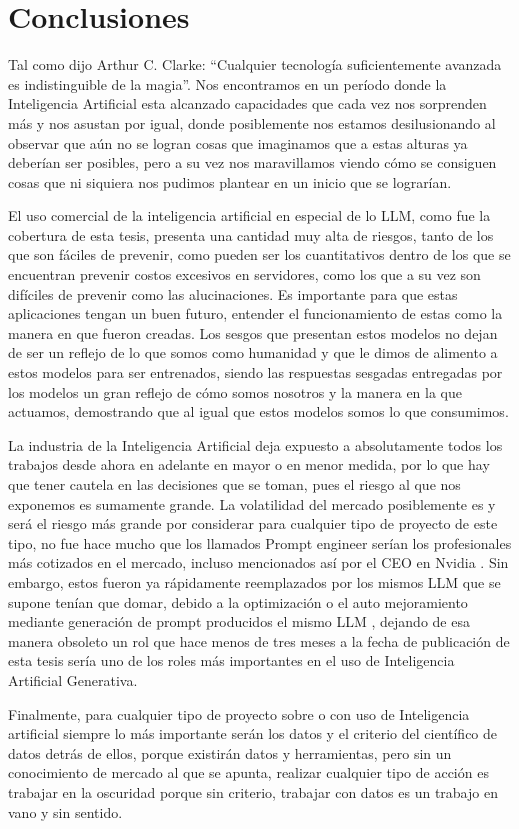 
\chapter{Conclusiones}

\par Tal como dijo Arthur C. Clarke: ``Cualquier tecnología suficientemente avanzada es indistinguible de la magia''. Nos encontramos 
en un período donde la Inteligencia Artificial esta alcanzado capacidades que cada vez nos sorprenden más y nos asustan por igual, donde 
posiblemente nos estamos desilusionando al observar que aún no se logran cosas que imaginamos que a estas alturas ya deberían ser posibles, pero a su vez nos maravillamos viendo cómo se consiguen 
cosas que ni siquiera nos pudimos plantear en un inicio que se lograrían.  

\par El uso comercial de la inteligencia artificial en especial de lo LLM, como fue la cobertura de esta tesis, presenta una cantidad 
muy alta de riesgos, tanto de los que son fáciles de prevenir, como pueden ser los cuantitativos dentro de los que se encuentran prevenir costos excesivos en 
servidores, como los que a su vez son difíciles de prevenir como las alucinaciones.  Es importante para que estas aplicaciones tengan un buen futuro, 
entender el funcionamiento de estas como la manera en que fueron creadas. Los sesgos que presentan estos modelos no dejan de ser un reflejo
de lo que somos como humanidad y que le dimos de alimento a estos modelos para ser entrenados, siendo las respuestas sesgadas entregadas por los modelos un gran reflejo de cómo somos nosotros 
y la manera en la que actuamos, demostrando que al igual que estos modelos somos lo que consumimos.  

\par La industria de la Inteligencia Artificial deja expuesto a absolutamente todos los trabajos desde ahora en adelante en mayor 
o en menor medida, por lo que hay que tener cautela en las decisiones que se toman, pues el riesgo al que nos exponemos es sumamente grande. La 
volatilidad del mercado posiblemente es y será el riesgo más grande por considerar para cualquier tipo de proyecto de este tipo, 
no fue hace mucho que los llamados Prompt engineer serían los profesionales más cotizados en el mercado, incluso mencionados así por el CEO en 
Nvidia \cite{conclusion1}. Sin embargo, estos fueron ya rápidamente reemplazados por los mismos LLM que se supone tenían que domar, debido a la optimización \cite{conclusion2}
o el auto mejoramiento mediante generación de prompt producidos el mismo LLM \cite{conclusion3}, dejando de esa manera obsoleto un rol que hace menos de 
 tres meses a la fecha de publicación de esta tesis sería uno de los roles más importantes en el uso de Inteligencia Artificial Generativa.

\par Finalmente, para cualquier tipo de proyecto sobre o con uso de Inteligencia artificial siempre lo más importante serán los datos y el 
criterio del científico de datos detrás de ellos, porque existirán datos y herramientas, pero sin un conocimiento de mercado al que se apunta, 
realizar cualquier tipo de acción es trabajar en la oscuridad porque sin criterio, trabajar con datos es un trabajo en vano y sin sentido.
